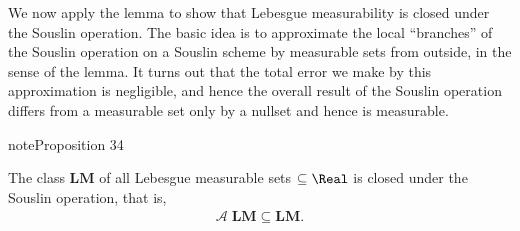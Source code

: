 \documentclass[letterpaper,10pt,english]{jupyterBook}
\begin{document}
\sphinxAtStartPar
We now apply the lemma to show that Lebesgue measurability is closed
under the Souslin operation. The basic idea is to approximate the local
“branches” of the Souslin operation on a Souslin scheme by measurable
sets from outside, in the sense of the lemma.
It turns out that the total error we make by this approximation is
negligible, and hence the overall result of the Souslin operation
differs from a measurable set only by a nullset and hence is
measurable.
\label{regularityAnalytic:prop-Souslin-Lebesgue}
\begin{sphinxadmonition}{note}{Proposition 34}



\sphinxAtStartPar
The class \(\mathbf{LM}\) of all Lebesgue measurable sets \(\subseteq \Real\) is closed under the Souslin operation, that is,
\begin{equation*}
\begin{split}
    \mathcal{A} \; \mathbf{LM} \subseteq  \mathbf{LM}.
\end{split}
\end{equation*}\end{sphinxadmonition}
\end{document}
